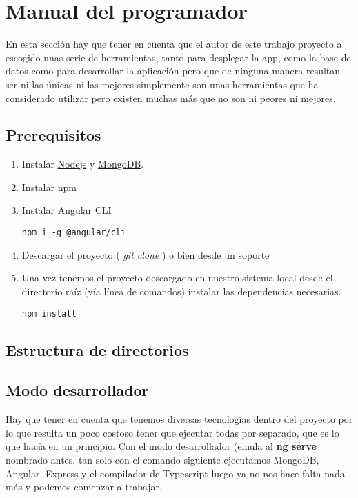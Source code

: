 \section{Manual del programador}
En esta sección hay que tener en cuenta que el autor de este trabajo proyecto a escogido unas serie de herramientas, tanto para desplegar la app, como la base de datos como para desarrollar la aplicación pero que de ninguna manera resultan ser ni las únicas ni las mejores simplemente son unas herramientas que ha considerado utilizar pero existen muchas más que no son ni peores ni mejores.

\subsection{Prerequisitos}
\begin{enumerate}
	\item Instalar \hyperlink{https://nodejs.org/en/}{Nodejs} y \hyperlink{https://www.mongodb.com/}{MongoDB}.
	\item Instalar \hyperlink{https://www.npmjs.com/}{npm}
	\item Instalar Angular CLI
		\lstset{language=C, breaklines=true, basicstyle=\footnotesize}
		\begin{lstlisting}[frame=single]
		npm i -g @angular/cli
    	\end{lstlisting}
    \item Descargar el proyecto ( \emph{git clone} ) o bien desde un soporte
	\item Una vez tenemos el proyecto descargado en nuestro sistema local desde el directorio raíz (vía línea de comandos) instalar las dependencias necesarias.
	\lstset{language=C, breaklines=true, basicstyle=\footnotesize}
		\begin{lstlisting}[frame=single]
		npm install
    	\end{lstlisting}
\end{enumerate}


\subsection{Estructura de directorios }



\subsection{Modo desarrollador}

Hay que tener en cuenta que tenemos diversas tecnologías dentro del proyecto por lo que resulta un poco costoso tener que ejecutar todas por separado, que es lo que hacía en un principio. Con el modo desarrollador (emula al \textbf{ng serve} nombrado antes, tan solo con el comando siguiente ejecutamos MongoDB, Angular, Express y el compilador de Typescript luego ya no nos hace falta nada más y podemos comenzar a trabajar. 

